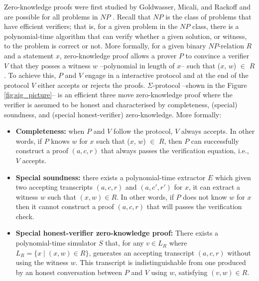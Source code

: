 \documentclass[conference,compsoc]{IEEEtran}
\begin{document}
Zero-knowledge proofs were first studied by Goldwasser, Micali, and Rackoff \cite{10.1145/22145.22178} and 
are possible for all problems in $NP$ \cite{10.1145/116825.116852}. Recall that $NP$ is the class of 
problems that have efficient verifiers; that is, for a given problem in the $NP$ class, there is 
a polynomial-time algorithm that can verify whether a given solution, or witness, to the problem is correct or not.
More formally, for a given binary $NP$-relation $R$ and a statement $x$, zero-knowledge proof allows a prover 
$P$ to convince a verifier $V$ that they posses a witness $w$ --polynomial in length of $x$-- such 
that ($x$, $w$) $\in$ $R$. To achieve this, $P$ and $V$ engage in a 
interactive protocol and  at the end of the protocol $V$ either accepts or rejects the proofs.
$\Sigma$-protocol --shown in the Figure \ref{fig:sig_picture}-- is an efficient three move zero-knowledge proof where the 
verifier is assumed to be honest and characterised by completeness, (special) soundness, and 
(special honest-verifier) zero-knowledge. More formally: 
\begin{itemize}
  \item \textbf{Completeness:}
  when $P$ and $V$ follow the protocol, $V$ always accepts. 
  In other words, if $P$ knows $w$ for $x$ such that ($x$, $w$) $\in$ $R$,  
  then $P$ can successfully construct a proof $(a, c, r)$ that always passes the verification equation, 
  i.e., $V$ accepts. 

\item \textbf{Special soundness:}
there exists a polynomial-time extractor $E$ which given 
two accepting transcripts $(a, c, r)$ and $(a, c', r')$ for $x$, 
it can extract a witness $w$ such that $(x, w) \in R$. In other words, 
if $P$ does not know $w$ for $x$ then it cannot construct a proof 
$(a, c, r)$ that will passes the verification check. 
\item \textbf{Special honest-verifier zero-knowledge proof:}
There exists a polynomial-time simulator $S$ that, for any 
$v \in L_R$ where $L_R = \{x  \mid (x, w) \in R\}$,
generates an accepting transcript $(a, c, r)$ 
without using the witness $w$. 
This transcript is indistinguishable from one produced by an 
honest conversation between $P$ and $V$ using $w$, 
satisfying $(v,w) \in R$.

\end{itemize}
\end{document}
